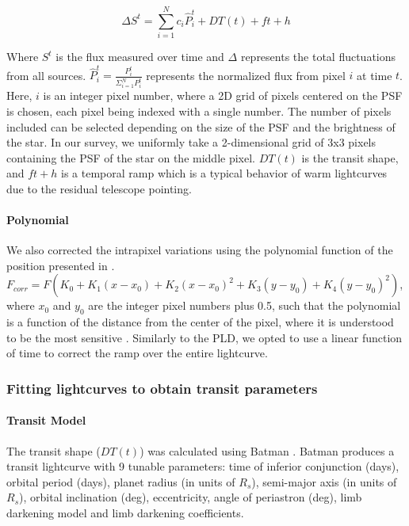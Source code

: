 \begin{equation}
    \Delta S^t = \sum_{i=1}^{N}c_i \hat{P}_i^t + DT(t) + ft + h
\end{equation}

Where $S^t$ is the flux measured over time and $\Delta$ represents the total fluctuations from all sources. $\hat{P}_i^t = \frac{P_i^t}{\Sigma_{i=1}^{N}P_i^t}$ represents the normalized flux from pixel $i$ at time $t$. Here, $i$ is an integer pixel number, where a 2D grid of pixels centered on the PSF is chosen, each pixel being indexed with a single number. The number of pixels included can be selected depending on the size of the PSF and the brightness of the star. In our survey, we uniformly take a 2-dimensional grid of 3x3 pixels containing the PSF of the star on the middle pixel. $DT(t)$ is the transit shape, and $ft+h$ is a temporal ramp which is a typical behavior of warm \spitzer lightcurves due to the residual telescope pointing.

\paragraph{Polynomial}

We also corrected the intrapixel variations using the polynomial function of the position presented in \citet{Knutson2008}. $F_{corr} = F(K_0 + K_1(x-x_0) + K_2(x-x_0)^2 + K_3(y-y_0) + K_4(y-y_0)^2 )$, where $x_0$ and $y_0$ are the integer pixel numbers plus 0.5, such that the polynomial is a function of the distance from the center of the pixel, where it is understood to be the most sensitive \citep{Stevenson2012}. Similarly to the PLD, we opted to use a linear function of time to correct the ramp over the entire lightcurve.

\subsubsection{Fitting lightcurves to obtain transit parameters}

\paragraph{Transit Model}

The transit shape ($DT(t)$) was calculated using Batman \citep{Kreidberg2015}. Batman produces a transit lightcurve with 9 tunable parameters:
time of inferior conjunction (days),
orbital period (days),
planet radius (in units of $R_s$),
semi-major axis (in units of $R_s$),
orbital inclination (deg),
eccentricity,
angle of periastron (deg),
limb darkening model and limb darkening coefficients.

